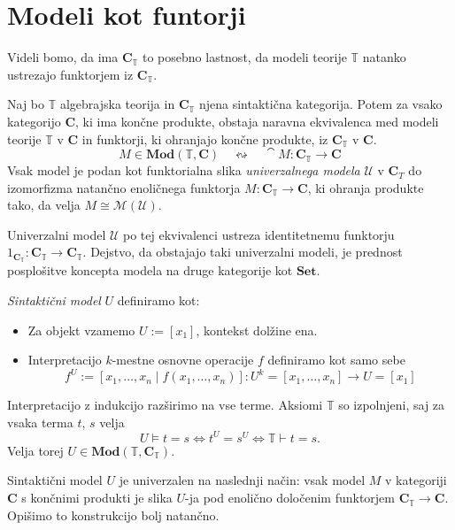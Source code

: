 \documentclass[../kategoricna_logika.tex]{subfiles}
\begin{document}
\section{Modeli kot funtorji}
%
Videli bomo, da ima $\mathbf{C}_{\mathbb{T}}$ to posebno lastnost, da modeli
teorije $\mathbb{T}$ natanko ustrezajo funktorjem iz $\mathbf{C}_{\mathbb{T}}$.
\begin{izrek}
\label{sec:modeli-kot-funtorji}
Naj bo $\mathbb{T}$ algebrajska teorija in $\mathbf{C}_{\mathbb{T}}$ njena
sintaktična kategorija. Potem za vsako kategorijo $\mathbf{C}$, ki ima končne
produkte, obstaja naravna ekvivalenca med modeli teorije $\mathbb{T}$ v
$\mathbf{C}$ in funktorji, ki ohranjajo končne produkte, iz
$\mathbf{C}_{\mathbb{T}}$ v $\mathbf{C}$.
$$M \in \mathbf{Mod}(\mathbb{T}, \mathbf{C})\quad \leftrightsquigarrow \quad \cat{M} : \mathbf{C}_\mathbb{T} \to \mathbf{C}$$
Vsak model je podan kot funktorialna slika \emph{univerzalnega modela}
$\mathcal{U}$ v $\mathbf{C}_T$ do izomorfizma natančno enoličnega funktorja
$M : \mathbf{C}_{\mathbb{T}} \to \mathbf{C}$, ki ohranja produkte tako, da velja
$M \cong \mathcal{M}(\mathcal{U})$.
\end{izrek}
\begin{opomba}
  Univerzalni model $\mathcal{U}$ po tej ekvivalenci ustreza identitetnemu
  funktorju $1_{\mathbf{C}_{\mathbb{T}}} : \mathbf{C}_{\mathbb{T}} \to \mathbf{C}_{\mathbb{T}}$.
  Dejstvo, da obstajajo taki univerzalni modeli, je prednost posplošitve
  koncepta modela na druge kategorije kot $\mathbf{Set}$.
\end{opomba}
%
\begin{definicija}
\emph{Sintaktični model} $U$ definiramo kot:
\begin{itemize}
\item Za objekt vzamemo $U := [x_1]$, kontekst dolžine ena.
%
\item Interpretacijo $k$-mestne osnovne operacije $f$ definiramo kot
  samo sebe
$$f^U := [x_1, \ldots, x_n \mid f(x_1, \ldots, x_n)] : U^k = [x_1, \ldots, x_n] \to U = [x_1]$$
\end{itemize}
%
Interpretacijo z indukcijo razširimo na vse terme.
Aksiomi $\mathbb{T}$ so izpolnjeni, saj za vsaka terma $t$, $s$ velja
$$U \models t = s \Longleftrightarrow t^U = s^U \Longleftrightarrow \mathbb{T} \vdash t = s.$$
Velja torej
$U \in \mathbf{Mod}(\mathbb{T}, \mathbf{C}_\mathbb{T})$.
\end{definicija}
%
Sintaktični model $U$ je univerzalen na naslednji način:
vsak model $M$ v kategoriji $\mathbf{C}$ s končnimi produkti je
slika $U$-ja pod enolično določenim funktorjem $\mathbf{C}_{\mathbb{T}} \to \mathbf{C}$.
Opišimo to konstrukcijo bolj natančno.
\end{document}
